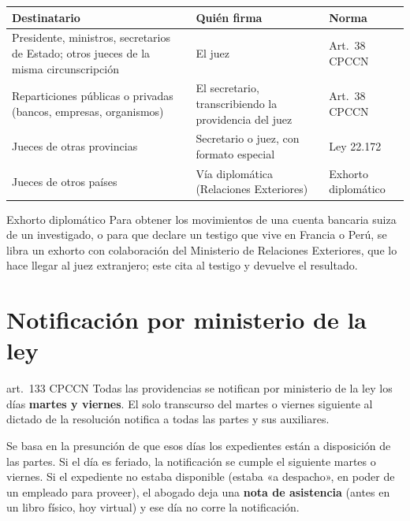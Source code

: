 \documentclass[12pt,oneside]{book}
\renewcommand{\arraystretch}{1.15}
\begin{document}
\begin{table}[H]
\centering
\renewcommand{\arraystretch}{1.25}
\begin{tabularx}{\textwidth}{>{\RaggedRight\arraybackslash}p{}>{\RaggedRight\arraybackslash}X>{\RaggedRight\arraybackslash}p{}}
\toprule
\textbf{Destinatario} & \textbf{Quién firma} & \textbf{Norma} \\
\midrule
Presidente, ministros, secretarios de Estado; otros jueces de la misma circunscripción & El juez & Art.~38 CPCCN \\
Reparticiones públicas o privadas (bancos, empresas, organismos) & El secretario, transcribiendo la providencia del juez & Art.~38 CPCCN \\
Jueces de otras provincias & Secretario o juez, con formato especial & Ley 22.172 \\
Jueces de otros países & Vía diplomática (Relaciones Exteriores) & Exhorto diplomático \\
\bottomrule
\end{tabularx}
\end{table}


\begin{ejemplo}{Exhorto diplomático}
Para obtener los movimientos de una cuenta bancaria suiza de un investigado, o para que declare un testigo que vive en Francia o Perú, se libra un exhorto con colaboración del Ministerio de Relaciones Exteriores, que lo hace llegar al juez extranjero; este cita al testigo y devuelve el resultado.
\end{ejemplo}

\section{Notificación por ministerio de la ley}

\begin{regla}{art.~133 CPCCN}
Todas las providencias se notifican por ministerio de la ley los días \textbf{martes y viernes}. El solo transcurso del martes o viernes siguiente al dictado de la resolución notifica a todas las partes y sus auxiliares.
\end{regla}

Se basa en la presunción de que esos días los expedientes están a disposición de las partes. Si el día es feriado, la notificación se cumple el siguiente martes o viernes. Si el expediente no estaba disponible (estaba «a despacho», en poder de un empleado para proveer), el abogado deja una \textbf{nota de asistencia} (antes en un libro físico, hoy virtual) y ese día no corre la notificación.
\end{document}
